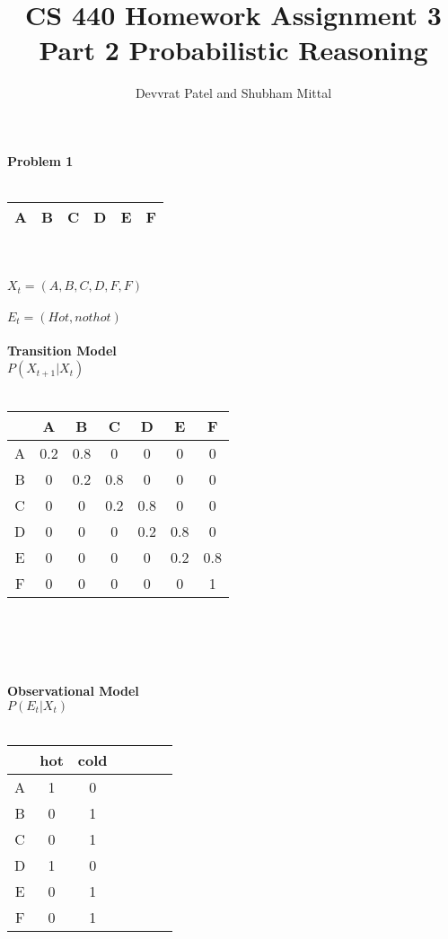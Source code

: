 \documentclass[11pt,a4paper]{article}
\begin{document}
 
\title{CS 440 Homework Assignment 3 Part 2 \newline
Probabilistic Reasoning}
\author{Devvrat Patel and Shubham Mittal}
\maketitle
\newpage
\textbf{
Problem 1}\\\\
 
\begin{tabular}{|c|c|c|c|c|c|} 
\hline
A & B & C & D & E & F \\ \hline
\end{tabular}\\\\
$X_{t} = (A, B, C, D, F, F)$\\\\
$E_{t} = (Hot, not hot)$\\\\
\textbf{Transition Model}\\
$P(X_{t+1}|X_{t})$\\\\
\begin{tabular}{c| c c c c c c|} 
 & A & B & C & D & E & F \\ \hline
A & 0.2 & 0.8 & 0 &  0 & 0 & 0\\
B & 0 & 0.2 & 0.8 &  0 & 0 & 0\\
C & 0 & 0 & 0.2 &  0.8 & 0 & 0\\
D & 0 & 0 & 0 &  0.2 & 0.8 & 0\\
E & 0 & 0 & 0 &  0 & 0.2 & 0.8\\
F & 0 & 0 & 0 &  0 & 0 & 1\\ \hline
\end{tabular}\\\\\\\\
\textbf{Observational Model}\\
$P(E_{t}|X_{t})$\\\\
\begin{tabular}{c| c c c c c c|} 
 & hot & cold \\ \hline
A & 1 & 0 \\
B & 0 & 1 \\
C & 0 & 1 \\
D & 1 & 0  \\
E & 0 & 1  \\
F & 0 & 1  \\ \hline
\end{tabular}\\\\\\
\end{document}
